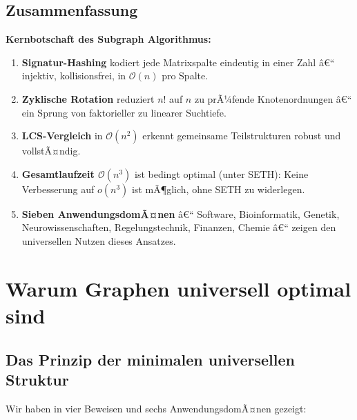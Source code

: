 ﻿\documentclass[12pt,a4paper,twoside]{article}
\theoremstyle{definition}
\theoremstyle{plain}
\theoremstyle{remark}
\begin{document}
\subsection{Zusammenfassung}
\label{sub:sa_summary}

\textbf{Kernbotschaft des Subgraph Algorithmus:}
\begin{enumerate}
  \item \textbf{Signatur-Hashing} kodiert jede Matrixspalte
        eindeutig in einer Zahl â€“ injektiv, kollisionsfrei,
        in $\mathcal{O}(n)$ pro Spalte.
  \item \textbf{Zyklische Rotation} reduziert $n!$ auf $n$
        zu prÃ¼fende Knotenordnungen â€“ ein Sprung von
        faktorieller zu linearer Suchtiefe.
  \item \textbf{LCS-Vergleich} in $\mathcal{O}(n^2)$ erkennt
        gemeinsame Teilstrukturen robust und vollstÃ¤ndig.
  \item \textbf{Gesamtlaufzeit $\mathcal{O}(n^3)$} ist
        bedingt optimal (unter SETH): Keine Verbesserung
        auf $o(n^3)$ ist mÃ¶glich, ohne SETH zu widerlegen.
  \item \textbf{Sieben AnwendungsdomÃ¤nen} â€“ Software,
        Bioinformatik, Genetik, Neurowissenschaften,
        Regelungstechnik, Finanzen, Chemie â€“ zeigen den
        universellen Nutzen dieses Ansatzes.
\end{enumerate}

\section{Warum Graphen universell optimal sind}
\label{sec:synthese}

\subsection{Das Prinzip der minimalen universellen Struktur}

Wir haben in vier Beweisen und sechs AnwendungsdomÃ¤nen
gezeigt:
\end{document}
